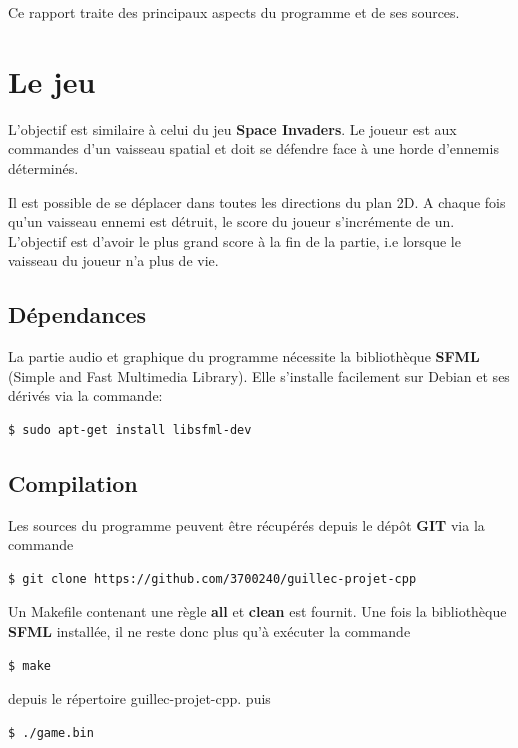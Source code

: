 \documentclass{article}
\begin{document}
Ce rapport traite des principaux aspects du programme et de ses sources.

\section{Le jeu}

L'objectif est similaire à celui du jeu \textbf{Space Invaders}. Le joueur est aux commandes d'un vaisseau spatial et doit se défendre face à une horde d'ennemis déterminés.

Il est possible de se déplacer dans toutes les directions du plan 2D. A chaque fois qu'un vaisseau ennemi est détruit, le score du joueur s'incrémente de un. L'objectif est d'avoir le plus grand score à la fin de la partie, i.e lorsque le vaisseau du joueur n'a plus de vie.

\subsection{Dépendances}

La partie audio et graphique du programme nécessite la bibliothèque \textbf{SFML} (Simple and Fast Multimedia Library). Elle s'installe facilement sur Debian et ses dérivés via la commande:

\begin{lstlisting}[language=bash]
$ sudo apt-get install libsfml-dev
\end{lstlisting}

\subsection{Compilation}

Les sources du programme peuvent être récupérés depuis le dépôt \textbf{GIT} via la commande

\begin{lstlisting}[language=bash]
$ git clone https://github.com/3700240/guillec-projet-cpp
\end{lstlisting}

Un Makefile contenant une règle \textbf{all} et \textbf{clean} est fournit. Une fois la bibliothèque \textbf{SFML} installée, il ne reste donc plus qu'à exécuter la commande

\begin{lstlisting}[language=bash]
$ make
\end{lstlisting}

depuis le répertoire guillec-projet-cpp. puis

\begin{lstlisting}[language=bash]
$ ./game.bin
\end{lstlisting}
\end{document}
